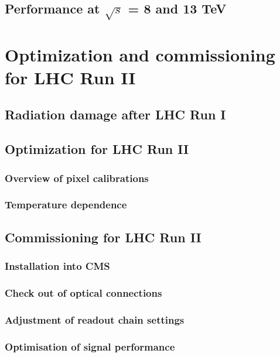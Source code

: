 \section{Performance at $\sqrt{s}$ = 8 and 13 TeV}

\chapter{Optimization and commissioning for LHC Run II}

\section{Radiation damage after LHC Run I}
\section{Optimization for LHC Run II}
\subsection{Overview of pixel calibrations}
\subsection{Temperature dependence}

\section{Commissioning for LHC Run II}
\subsection{Installation into CMS}
\subsection{Check out of optical connections}
\subsection{Adjustment of readout chain settings}
\subsection{Optimisation of signal performance}

